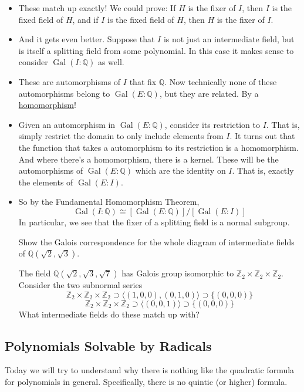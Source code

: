 \documentclass[12pt]{article}
\theoremstyle{plain}
\theoremstyle{definition}
\theoremstyle{remark}
\newcommand{\ex}{\noindent{\bf Ex: }}
\def\Z{\mathbb Z}
\def\Q{\mathbb Q}
\DeclareMathOperator{\Gal}{Gal}
\newcommand{\todayis}[1]{\clearpage{\rhead{\footnotesize #1}}}
\begin{document}
\begin{itemize}
\item These match up exactly!  We could prove: If $H$ is the fixer of $I$, then $I$ is the fixed field of $H$, and if $I$ is the fixed field of $H$, then $H$ is the fixer of $I$.

\item And it gets even better.  Suppose that $I$ is not just an intermediate field, but is itself a splitting field from some polynomial.  In this case it makes sense to consider $\Gal(I:\Q)$ as well.  

\item These are automorphisms of $I$ that fix $\Q$.  Now technically none of these automorphisms belong to $\Gal(E:\Q)$, but they are related.  By a \underline{homomorphism}!

\item Given an automorphism in $\Gal(E:\Q)$, consider its restriction to $I$.  That is, simply restrict the domain to only include elements from $I$.  It turns out that the function that takes a automorphism to its restriction is a homomorphism.  And where there's a homomorphism, there is a kernel.  These will be the automorphisms of $\Gal(E:\Q)$ which are the identity on $I$.  That is, exactly the elements of $\Gal(E:I)$.

\item So by the Fundamental Homomorphism Theorem, 
\[\Gal(I:\Q) \cong [\Gal(E:\Q)]/[\Gal(E:I)]\]
In particular, we see that the fixer of a splitting field is a normal subgroup.

\ex Show the Galois correspondence for the whole diagram of intermediate fields of $\Q(\sqrt{2},\sqrt{3})$.

\ex The field $\Q(\sqrt{2},\sqrt{3}, \sqrt{7})$ has Galois group isomorphic to $\Z_2\times\Z_2\times\Z_2$.  Consider the two subnormal series
\[\Z_2\times\Z_2\times\Z_2 \supset \langle (1,0,0), (0,1,0)\rangle \supset \{(0,0,0)\}\]
\[\Z_2\times\Z_2\times\Z_2 \supset \langle (0,0,1)\rangle \supset \{(0,0,0)\}\]
What intermediate fields do these match up with?
\end{itemize}


\todayis{Wednesday, April 3}

\subsection*{Polynomials Solvable by Radicals}

Today we will try to understand why there is nothing like the quadratic formula for polynomials in general.  Specifically, there is no quintic (or higher) formula.
\end{document}
